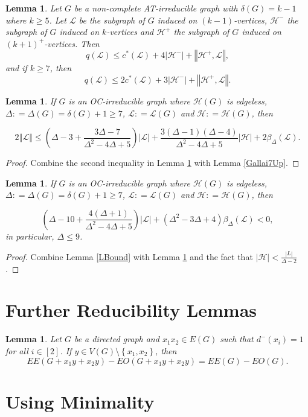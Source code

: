 \documentclass[12pt]{article}
\theoremstyle{plain}
\newtheorem{lem}[thm]{Lemma}
\theoremstyle{definition}
\theoremstyle{remark}
\newcommand{\fancy}[1]{\mathcal{#1}}
\renewcommand{\L}{\fancy{L}}
\newcommand{\HH}{\fancy{H}}
\newcommand{\set}[1]{\left\{ #1 \right\}}
\newcommand{\card}[1]{\left|#1\right|}
\newcommand{\size}[1]{\left\Vert#1\right\Vert}
\newcommand{\irange}[1]{\left[#1\right]}
\newcommand{\parens}[1]{\left( #1 \right)}
\newcommand{\DefinedAs}{\mathrel{\mathop:}=}
\begin{document}
\begin{lem}\label{qLemma}
	Let $G$ be a non-complete AT-irreducible graph with $\delta(G) = k-1$ where $k \ge 5$.  Let $\L$ be the subgraph of $G$ induced on $(k-1)$-vertices, $\HH^-$ the subgraph of $G$ induced on $k$-vertices and 
	$\HH^+$ the subgraph of $G$ induced on $(k+1)^+$-vertices.  Then
	\[q(\L) \le c^*(\L) + 4\card{\HH^-} + \size{\HH^+, \L},\] and if $k \ge 7$, then
	\[q(\L) \le 2c^*(\L) + 3\card{\HH^-} + \size{\HH^+, \L}.\]
\end{lem}

\begin{lem}\label{QuaBound}
If $G$ is an OC-irreducible graph where $\HH(G)$ is edgeless, $\Delta \DefinedAs \Delta(G) = \delta(G) + 1 \ge 7$, $\L\DefinedAs\L(G)$ and $\HH \DefinedAs \HH(G)$, then

\[2\size{\L} \le \parens{\Delta-3 + \frac{3\Delta-7}{\Delta^2-4\Delta+5}}\card{\L} + \frac{3(\Delta-1)(\Delta-4)}{\Delta^2-4\Delta+5}\card{\HH} +  2\beta_{\Delta}(\L).\]
\end{lem}
\begin{proof}
Combine the second inequality in Lemma \ref{qLemma} with Lemma \ref{Gallai7Up}.
\end{proof}

\begin{lem}
If $G$ is an OC-irreducible graph where $\HH(G)$ is edgeless, $\Delta \DefinedAs \Delta(G) = \delta(G) + 1 \ge 7$, $\L\DefinedAs\L(G)$ and $\HH \DefinedAs \HH(G)$, then

\[\parens{\Delta-10 + \frac{4(\Delta+1)}{\Delta^2-4\Delta+5}}\card{\L} + \parens{\Delta^2-3\Delta+4}\beta_{\Delta}(\L)< 0,\]
in particular, $\Delta \le 9$.
\end{lem}
\begin{proof}
Combine Lemma \ref{LBound} with Lemma \ref{QuaBound} and the fact that $\card{\HH} < \frac{\card{L}}{\Delta-2}$.
\end{proof}

\section{Further Reducibility Lemmas}
\begin{lem}
Let $G$ be a directed graph and $x_1x_2 \in E(G)$ such that $d^-(x_i) = 1$ for all $i\in \irange{2}$.  If $y \in V(G) \setminus \set{x_1,x_2}$, then
\[EE(G + x_1y + x_2y)-EO(G + x_1y + x_2y) = EE(G) - EO(G).\]
\end{lem}

\section{Using Minimality}
\end{document}
